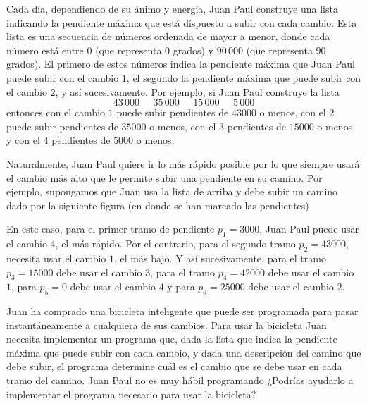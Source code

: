 \documentclass{oci}
\begin{document}
\begin{problemDescription}
Cada día, dependiendo de su ánimo y energía, Juan Paul construye una lista indicando la pendiente 
máxima que está dispuesto a 
subir con cada cambio. 
Esta lista es una secuencia de números ordenada de mayor a menor, donde cada
número está entre $0$ (que representa $0$ grados) y $90\,000$ (que representa
$90$ grados).
El primero de estos números indica la pendiente máxima que Juan Paul puede 
subir con el cambio $1$, el segundo la pendiente máxima que puede 
subir con el cambio $2$, y así sucesivamente.
Por ejemplo, si Juan Paul construye la lista
\[
43\, 000\;\;\;\;\; 35\, 000\;\;\;\;\; 15\, 000\;\;\;\;\; 5\, 000
\]
entonces con el cambio $1$ puede subir pendientes de $43000$ o menos, con el 
$2$ puede subir pendientes de $35000$ o menos, con el $3$ pendientes de
$15000$ o menos, y con el $4$ pendientes de $5000$ o menos.

Naturalmente, Juan Paul quiere ir lo más rápido posible por lo que 
siempre usará el cambio más alto que le permite subir
una pendiente en su camino.
Por ejemplo, supongamos que Juan usa la lista de arriba y debe subir un 
camino dado por la siguiente figura (en donde se han marcado
las pendientes)
\begin{center}

\end{center}

En este caso, para el primer tramo de pendiente $p_1=3000$, Juan Paul puede usar el cambio $4$, 
el más rápido.
Por el contrario, para el segundo tramo $p_2=43 000$, necesita usar el cambio $1$, el más bajo. 
Y así sucesivamente, para el tramo $p_3=15 000$ debe usar el cambio $3$, para el tramo $p_4=42 000$
debe usar el cambio $1$, para $p_5=0$ debe usar el cambio $4$ y para $p_6=25 000$ debe usar
el cambio $2$.

Juan ha comprado una bicicleta inteligente que puede ser programada para 
pasar instantáneamente a cualquiera de sus cambios. 
Para usar la bicicleta Juan necesita implementar un programa que, dada
la lista que indica la pendiente máxima que puede subir con cada cambio,
y dada una descripción del camino que debe subir,
el programa determine cuál es el cambio que se debe usar en cada tramo del camino.
Juan Paul no es muy hábil programando ¿Podrías ayudarlo a implementar el
programa necesario para usar la bicicleta?
 


\end{problemDescription}
\end{document}
